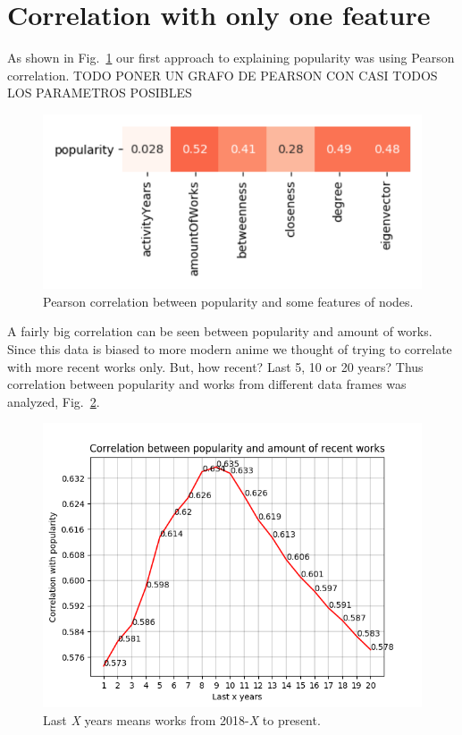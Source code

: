 \section{Correlation with only one feature}
As shown in Fig.~\ref{fig:pearsonCorr} our first approach to explaining popularity was using Pearson correlation. 
TODO PONER UN GRAFO DE PEARSON CON CASI TODOS LOS PARAMETROS POSIBLES

\begin{figure}[!hbt]
	\begin{center}
	\includegraphics[width=\columnwidth]{graphics/10Works_correlation_Pearson.png}
	\caption{Pearson correlation between popularity and some features of nodes.}
	\label{fig:pearsonCorr}
	\end{center}
\end{figure}

A fairly big correlation can be seen between popularity and amount of works. Since this data is biased to more modern anime we thought of trying to correlate with more recent works only. But, how recent? Last 5, 10 or 20 years? Thus correlation between popularity and works from different data frames was analyzed, Fig.~\ref{fig:correlationPopRecentWorks}.

\begin{figure}[!hbt]
	\begin{center}
	\includegraphics[width=\columnwidth]{graphics/correlationPopRecentWorks.png}
	\caption{Last \textit{X} years means works from 2018-\textit{X} to present.}
	\label{fig:correlationPopRecentWorks}
	\end{center}
\end{figure}

